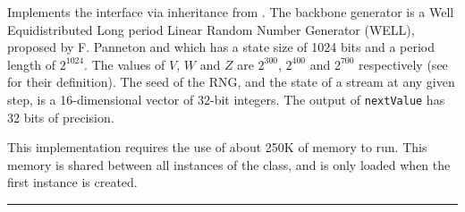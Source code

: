 
Implements the  interface via inheritance from
. The backbone generator is a Well Equidistributed
Long period Linear Random Number Generator (WELL),  proposed by F.
 Panneton\html{,} and which has a state size
of 1024 bits and a period length of 
\latex{$\rho\approx$} $2^{1024}$. The values of $V$, $W$ and $Z$ are $2^{300}$,
$2^{400}$ and $2^{700}$ respectively (see  for their
definition). The seed of the RNG, and the state of a stream at any given
step, is a 16-dimensional vector of 32-bit integers.
The output of \texttt{nextValue} has 32 bits of precision.

This implementation requires the use of about
250K of memory to run. This memory is shared between all instances of the
class, and is only loaded when the first instance is created.

\bigskip\hrule

